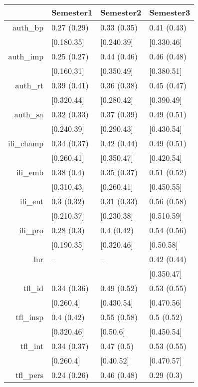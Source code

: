 \begin{table}[ht]
\centering
\begin{tabular}{rlll}
  \hline
 & Semester1 & Semester2 & Semester3 \\ 
  \hline
auth\_bp & 0.27 (0.29) & 0.33 (0.35) & 0.41 (0.43) \\ 
   & [0.180.35] & [0.240.39] & [0.330.46] \\ 
  auth\_imp & 0.25 (0.27) & 0.44 (0.46) & 0.46 (0.48) \\ 
     & [0.160.31] & [0.350.49] & [0.380.51] \\ 
  auth\_rt & 0.39 (0.41) & 0.36 (0.38) & 0.45 (0.47) \\ 
       & [0.320.44] & [0.280.42] & [0.390.49] \\ 
  auth\_sa & 0.32 (0.33) & 0.37 (0.39) & 0.49 (0.51) \\ 
         & [0.240.39] & [0.290.43] & [0.430.54] \\ 
  ili\_champ & 0.34 (0.37) & 0.42 (0.44) & 0.49 (0.51) \\ 
           & [0.260.41] & [0.350.47] & [0.420.54] \\ 
  ili\_emb & 0.38 (0.4) & 0.35 (0.37) & 0.51 (0.52) \\ 
             & [0.310.43] & [0.260.41] & [0.450.55] \\ 
  ili\_ent & 0.3 (0.32) & 0.31 (0.33) & 0.56 (0.58) \\ 
               & [0.210.37] & [0.230.38] & [0.510.59] \\ 
  ili\_pro & 0.28 (0.3) & 0.4 (0.42) & 0.54 (0.56) \\ 
                 & [0.190.35] & [0.320.46] & [0.50.58] \\ 
  lnr & -- & -- & 0.42 (0.44) \\ 
                   &  &  & [0.350.47] \\ 
  tfl\_id & 0.34 (0.36) & 0.49 (0.52) & 0.53 (0.55) \\ 
                     & [0.260.4] & [0.430.54] & [0.470.56] \\ 
  tfl\_insp & 0.4 (0.42) & 0.55 (0.58) & 0.5 (0.52) \\ 
                       & [0.320.46] & [0.50.6] & [0.450.54] \\ 
  tfl\_int & 0.34 (0.37) & 0.47 (0.5) & 0.53 (0.55) \\ 
                         & [0.260.4] & [0.40.52] & [0.470.57] \\ 
  tfl\_pers & 0.24 (0.26) & 0.46 (0.48) & 0.29 (0.3) \\ 

\end{tabular}
\end{table}
